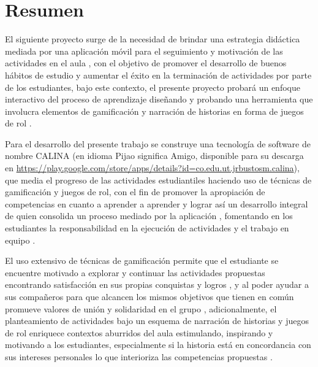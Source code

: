 \section*{Resumen}

\begin{singlespace}
El siguiente proyecto surge de la necesidad de brindar una estrategia didáctica mediada por una aplicación 
móvil para el seguimiento y motivación de las actividades en el aula \cite{SAILER2017371, DAROCHASEIXAS201648}, 
con el objetivo de promover el desarrollo de buenos hábitos de estudio y aumentar el éxito en la terminación 
de actividades por parte de los estudiantes, bajo este contexto, el presente proyecto probará un enfoque 
interactivo del proceso de aprendizaje diseñando y probando una herramienta que involucra elementos de 
gamificación y narración de historias en forma de juegos de rol \cite{rauscher2021comics}.

Para el desarrollo del presente trabajo se construye una tecnología de software de nombre CALINA (en idioma 
Pijao significa Amigo, disponible para su descarga en 
\url{https://play.google.com/store/apps/details?id=co.edu.ut.jrbustosm.calina}), que media el progreso de las 
actividades estudiantiles haciendo uso de técnicas de gamificación y juegos de rol, con el fin de promover la 
apropiación de competencias en cuanto a aprender a aprender y lograr así un desarrollo integral de quien 
consolida un proceso mediado por la aplicación \cite{tornero2016ideas, molina_reconfiguracion_2021}, 
fomentando en los estudiantes la responsabilidad en la ejecución de actividades y el trabajo en equipo 
\cite{XU2017}.

El uso extensivo de técnicas de gamificación permite que el estudiante se encuentre motivado a explorar y 
continuar las actividades propuestas encontrando satisfacción en sus propias conquistas y logros 
\cite{Danka2020, MULLINS2020304}, y al poder ayudar a sus compañeros para que alcancen los mismos objetivos 
que tienen en común promueve valores de unión y solidaridad en el grupo \cite{DING20191}, adicionalmente, el 
planteamiento de actividades bajo un esquema de narración de historias y juegos de rol enriquece contextos 
aburridos del aula estimulando, inspirando y motivando a los estudiantes, especialmente si la historia está en 
concordancia con sus intereses personales lo que interioriza las competencias propuestas 
\cite{8190501, Young2015199}. 


\end{singlespace}
